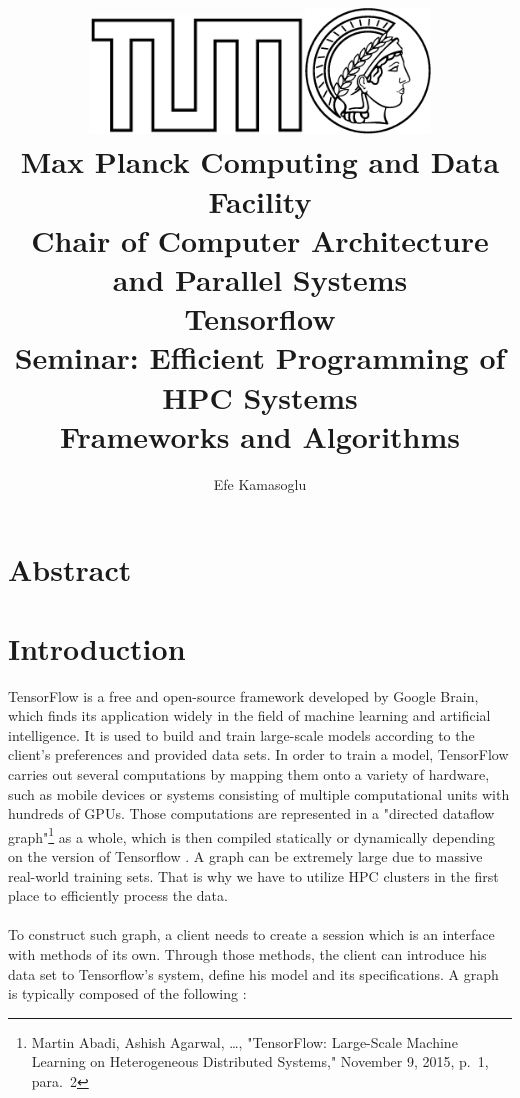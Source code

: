 \documentclass[ieeetran]{article}
\title{\includegraphics[width=0.43\textwidth]{tumlogo}\hspace{2ex}\includegraphics[width=0.25\textwidth]{maxlogo}\vspace{1ex}\\ \large \textbf{Max Planck Computing and Data Facility \\Chair of Computer Architecture and Parallel Systems} \vspace{10ex}\\ \huge Tensorflow \vspace{2ex}\\
\large Seminar: Efficient Programming of HPC Systems \\Frameworks and Algorithms\vspace{15ex}}
\author{Efe Kamasoglu}
\begin{document}
\maketitle

\pagebreak

\tableofcontents

\pagebreak

\section*{Abstract}



\pagebreak


\section{Introduction} %
\label{sec:introduction}
TensorFlow is a free and open-source framework developed by Google Brain, which finds its application widely in the field of machine learning and artificial intelligence. It is used to build and train large-scale models according to the client's preferences and provided data sets. In order to train a model, TensorFlow carries out several computations by mapping them onto a variety of hardware, such as mobile devices or systems consisting of multiple computational units with hundreds of GPUs. Those computations are represented in a "directed dataflow graph"\footnote{Martin Abadi, Ashish Agarwal, \ldots, "TensorFlow: Large-Scale Machine Learning on Heterogeneous Distributed Systems," November 9, 2015, p.\ 1, para.\ 2} as a whole, which is then compiled statically or dynamically depending on the version of Tensorflow \cite{first}. A graph can be extremely large due to massive real-world training sets. That is why we have to utilize HPC clusters in the first place to efficiently process the data.
\\ \\To construct such graph, a client needs to create a session which is an interface with methods of its own. Through those methods, the client can introduce his data set to Tensorflow's system, define his model and its specifications. A graph is typically composed of the following \cite{first}:
\end{document}
